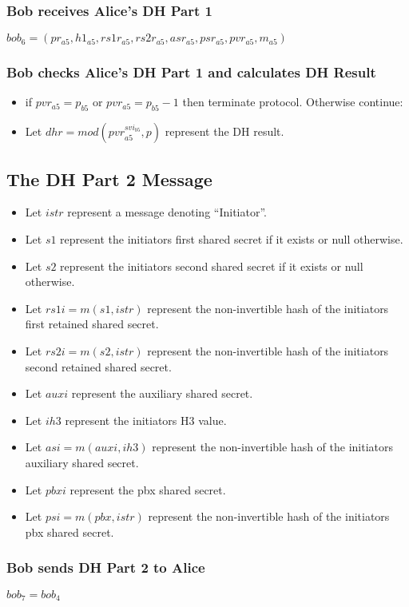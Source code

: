 \documentclass[11pt]{article}
\begin{document}
  \subsubsection{Bob receives Alice's DH Part 1}
  $bob_6=(pr_{a5},h1_{a5},rs1r_{a5},rs2r_{a5},asr_{a5},psr_{a5},
           pvr_{a5},m_{a5})$
  \subsubsection{Bob checks Alice's DH Part 1 and calculates DH 
               Result}
  \begin{itemize}
    \item if $pvr_{a5} = p_{b5}$ or $pvr_{a5} = p_{b5} - 1$ then 
          terminate protocol. Otherwise continue:
    \item Let $dhr = mod(pvr_{a5}^{svi_{b5}},p)$ represent the 
          DH result.
  \end{itemize}
  \subsection{The DH Part 2 Message}
  \begin{itemize}
    \item Let $istr$ represent a message denoting ``Initiator''.
    \item Let $s1$ represent the initiators first shared secret if
          it exists or null otherwise.
    \item Let $s2$ represent the initiators second shared secret if
          it exists or null otherwise.
    \item Let $rs1i = m(s1,istr)$ represent the non-invertible hash 
          of the initiators first retained shared secret.
    \item Let $rs2i = m(s2,istr)$ represent the non-invertible hash
          of the initiators second retained shared secret.
    \item Let $auxi$ represent the auxiliary shared secret.
    \item Let $ih3$ represent the initiators H3 value.
    \item Let $asi = m(auxi,ih3)$ represent the non-invertible hash
          of the initiators auxiliary shared secret.
    \item Let $pbxi$ represent the pbx shared secret.
    \item Let $psi = m(pbx,istr)$ represent the non-invertible
          hash of the initiators pbx shared secret.
  \end{itemize}
  \subsubsection{Bob sends DH Part 2 to Alice}
  $bob_7 = bob_4$
\end{document}
